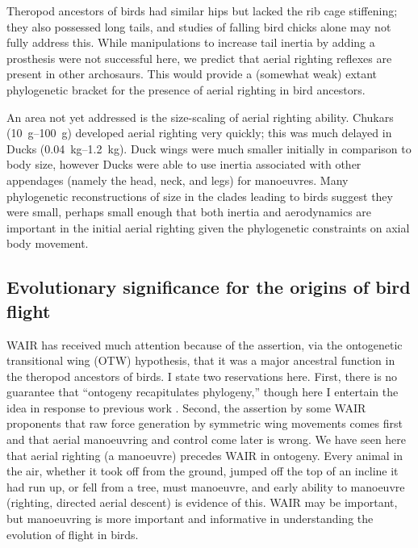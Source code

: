 \documentclass[10pt]{article}
\begin{document}
Theropod ancestors of birds had similar hips but lacked the rib cage stiffening; they also possessed long tails, and studies of falling bird chicks alone may not fully address this.  While manipulations to increase tail inertia by adding a prosthesis were not successful here, we predict that aerial righting reflexes are present in other archosaurs.  This would provide a (somewhat weak) extant phylogenetic bracket for the presence of aerial righting in bird ancestors.

An area not yet addressed is the size-scaling of aerial righting ability.  Chukars (\SIrange{10}{100}{\gram}) developed aerial righting very quickly; this was much delayed in Ducks (\SIrange{0.04}{1.2}{\kilo\gram}).  Duck wings were much smaller initially in comparison to body size, however Ducks were able to use inertia associated with other appendages (namely the head, neck, and legs) for manoeuvres.  Many phylogenetic reconstructions of size in the clades leading to birds suggest they were small, perhaps small enough that both inertia and aerodynamics are important in the initial aerial righting given the phylogenetic constraints on axial body movement.  

\subsection{Evolutionary significance for the origins of bird flight}
WAIR has received much attention because of the assertion, via the ontogenetic transitional wing (OTW) hypothesis, that it was a major ancestral function in the theropod ancestors of birds.  I state two reservations here.  First, there is no guarantee that ``ontogeny recapitulates phylogeny,'' though here I entertain the idea in response to previous work \citep{Dial:2003, Tobalske:2011, Bundle:2003, Dial:2008, Jackson:2009, Dial:2012}.  Second, the assertion by some WAIR proponents that raw force generation by symmetric wing movements comes first and that aerial manoeuvring and control come later is wrong.  We have seen here that aerial righting (a manoeuvre) precedes WAIR in ontogeny.  Every animal in the air, whether it took off from the ground, jumped off the top of an incline it had run up, or fell from a tree, must manoeuvre, and early ability to manoeuvre (righting, directed aerial descent) is evidence of this.  WAIR may be important, but manoeuvring is more important and informative in understanding the evolution of flight in birds. 
\end{document}
